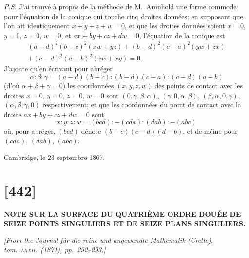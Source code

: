 \documentclass[11pt,a4paper]{article}
\begin{document}
\textit{P.S.} J'ai trouv\'{e} \`{a} propos de la m\'{e}thode de M.~Aronhold une forme commode pour l'\'{e}quation de la conique qui touche cinq droites donn\'{e}es; en supposant que l'on ait identiquement $x + y + z + w = 0$, et que les droites donn\'{e}es soient $x = 0$, $y = 0$, $z = 0$, $w = 0$, et $ax + by + cz + dw = 0$, l'\'{e}quation de la conique est
\begin{multline*}
(a - d)^2 (b - c)^2 (xw + yz) + (b - d)^2 (c - a)^2 (yw + zx) \\
+ (c - d)^2 (a - b)^2 (zw + xy) = 0.
\end{multline*}
J'ajoute qu'en \'{e}crivant pour abr\'{e}ger
\[
\alpha : \beta : \gamma = (a - d)(b - c) : (b - d)(c - a) : (c - d)(a - b)
\]
(d'o\`{u} $\alpha + \beta + \gamma = 0$) les coordonn\'{e}es $(x, y, z, w)$ des points de contact avec les droites $x = 0$, $y = 0$, $z = 0$, $w = 0$ sont $(0, \gamma, \beta, \alpha)$, $(\gamma, 0, \alpha, \beta)$, $(\beta, \alpha, 0, \gamma)$, $(\alpha, \beta, \gamma, 0)$ respectivement; et que les coordonn\'{e}es du point de contact avec la droite $ax + by + cz + dw = 0$ sont
\[
x : y : z : w = (bcd) : -(cda) : (dab) : -(abc)
\]
o\`{u}, pour abr\'{e}ger, $(bcd)$ d\'{e}note $(b - c)(c - d)(d - b)$, et de m\^{e}me pour $(cda)$, $(dab)$, $(abc)$.

Cambridge, le 23 septembre 1867.

\newpage
\section*{[442]}

\begin{center}
\textbf{\Large NOTE SUR LA SURFACE DU QUATRI\`{E}ME ORDRE DOU\'{E}E DE\\SEIZE POINTS SINGULIERS ET DE SEIZE PLANS SINGULIERS.}
\end{center}

\begin{flushright}
\textit{[From the \textit{Journal f\'{u}r die reine und angewandte Mathematik} (Crelle),}\\
\textit{tom.\ \textsc{lxxii}.\ (1871), pp.\ 292--293.]}
\end{flushright}
\end{document}
